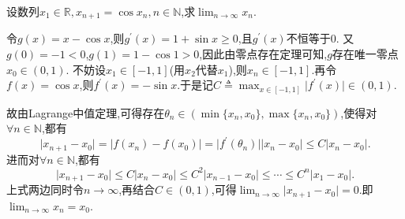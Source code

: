 \documentclass[../../main.tex]{subfiles}%
\begin{document}
\begin{example}
设数列\(x_1\in\mathbb{R},x_{n + 1} = \cos x_n,n\in\mathbb{N}\),求\(\lim_{n \to \infty} x_n\).
\end{example}
\begin{solution}
令\(g(x)=x - \cos x\),则\(g^\prime(x)=1 + \sin x\geqslant0\),且\(g^\prime(x)\)不恒等于\(0\).
又\(g(0)= -1 < 0\),\(g(1)=1 - \cos 1 > 0\),因此由零点存在定理可知,\(g\)存在唯一零点\(x_0\in(0,1)\).
不妨设\(x_1\in[-1,1]\)(用\(x_2\)代替\(x_1\)),则\(x_n\in[-1,1]\).再令\(f(x)=\cos x\),则\(f^\prime(x)=-\sin x\).于是记\(C\triangleq \max_{x\in[-1,1]}\vert f^\prime(x)\vert\in(0,1)\).

故由Lagrange中值定理,可得存在\(\theta_n\in(\min\{x_n,x_0\},\max\{x_n,x_0\})\),使得对\(\forall n\in\mathbb{N}\),都有
\[
\vert x_{n + 1}-x_0\vert=\vert f(x_n)-f(x_0)\vert=\vert f^\prime(\theta_n)\vert\vert x_n - x_0\vert\leqslant C\vert x_n - x_0\vert.
\]
进而对\(\forall n\in\mathbb{N}\),都有
\[
\vert x_{n + 1}-x_0\vert\leqslant C\vert x_n - x_0\vert\leqslant C^2\vert x_{n - 1}-x_0\vert\leqslant\cdots\leqslant C^n\vert x_1 - x_0\vert.
\]
上式两边同时令\(n\rightarrow\infty\),再结合\(C\in(0,1)\),可得\(\lim_{n\rightarrow\infty}\vert x_{n + 1}-x_0\vert = 0\).即\(\lim_{n\rightarrow\infty}x_n = x_0\).

\end{solution}
\end{document}
